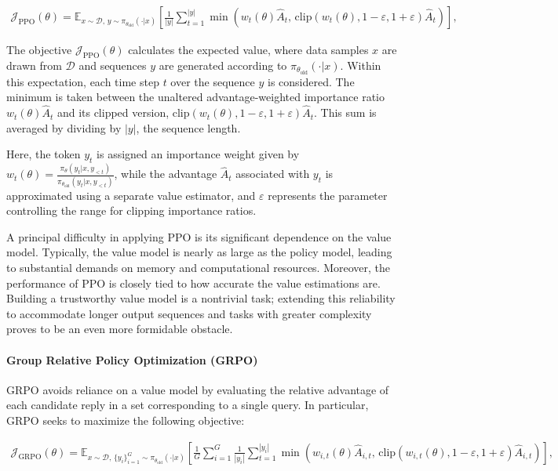 \begin{align}
\mathcal{J}_\text{PPO}(\theta) = \mathbb{E}_{ x \sim \mathcal{D},\, y \sim \pi_{\theta_\text{old}}( \cdot | x) }
\left[ \frac{1}{|y|} \sum_{t=1}^{|y|} 
\min \left( w_{t}(\theta) \widehat{A}_{t},  \, \mathrm{clip} \left( w_{t}(\theta), 1 - {\varepsilon}, 1 + {\varepsilon}\right) \widehat{A}_{t} \right)
\right],
\end{align}

The objective $\mathcal{J}_\text{PPO}(\theta)$ calculates the expected value, where data samples $x$ are drawn from $\mathcal{D}$ and sequences $y$ are generated according to $\pi_{\theta_\text{old}}( \cdot | x)$. Within this expectation, each time step $t$ over the sequence $y$ is considered. The minimum is taken between the unaltered advantage-weighted importance ratio $w_{t}(\theta) \widehat{A}_{t}$ and its clipped version, $\mathrm{clip} \left( w_{t}(\theta), 1 - {\varepsilon}, 1 + {\varepsilon}\right) \widehat{A}_{t}$. This sum is averaged by dividing by $|y|$, the sequence length.

Here, the token $y_t$ is assigned an importance weight given by $w_{t}(\theta) = \frac{ \pi_{\theta} (y_{t} | x, y_{<t}) }{ \pi_{\theta_\text{old}} (y_{t} | x,y_{<t})}$, while the advantage $\widehat{A}_{t}$ associated with $y_t$ is approximated using a separate value estimator, and $\varepsilon$ represents the parameter controlling the range for clipping importance ratios.

A principal difficulty in applying PPO is its significant dependence on the value model. Typically, the value model is nearly as large as the policy model, leading to substantial demands on memory and computational resources. Moreover, the performance of PPO is closely tied to how accurate the value estimations are. Building a trustworthy value model is a nontrivial task; extending this reliability to accommodate longer output sequences and tasks with greater complexity proves to be an even more formidable obstacle.

\paragraph{Group Relative Policy Optimization (GRPO)} GRPO \citep{grpo} avoids reliance on a value model by evaluating the relative advantage of each candidate reply in a set corresponding to a single query. In particular, GRPO seeks to maximize the following objective:

\begin{align}
\label{equ:grpo}
\mathcal{J}_\text{GRPO}(\theta) = \mathbb{E}_{ x \sim \mathcal{D},\, \{y_i\}_{i=1}^G \sim \pi_{\theta_\text{old}}( \cdot | x) }
\left[ \frac{1}{G} \sum_{i=1}^{G} \frac{1}{|y_i|} \sum_{t=1}^{|y_i|} 
\min \left( w_{i,t}(\theta) \widehat{A}_{i,t},  \, \mathrm{clip} \left( w_{i,t}(\theta), 1 - {\varepsilon}, 1 + {\varepsilon}\right) \widehat{A}_{i,t} \right)
\right],
\end{align}

